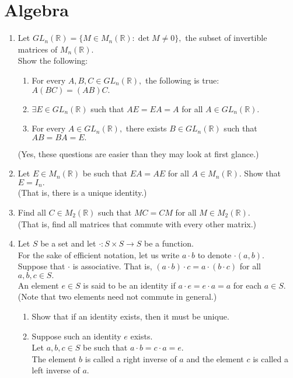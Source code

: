 \documentclass{article}
\begin{document}
\section{Algebra}
\begin{enumerate} 
	\item Let $GL_n(\mathbb{R}) = \{M \in M_n(\mathbb{R}) : \det M \neq 0\},$ the subset of invertible matrices of $M_n(\mathbb{R}).$\\
	Show the following:
	\begin{enumerate}[nosep] 
		\item For every $A, B, C \in GL_n(\mathbb{R}),$ the following is true: $A(BC) = (AB)C.$ 
		\item $\exists E \in GL_n(\mathbb{R})$ such that $AE = EA = A$ for all $A \in GL_n(\mathbb{R}).$
		\item For every $A \in GL_n(\mathbb{R}),$ there exists $B \in GL_n(\mathbb{R})$ such that $AB = BA = E.$
	\end{enumerate}
	(Yes, these questions are easier than they may look at first glance.)
	\item Let $E \in M_n(\mathbb{R})$ be such that $EA = AE$ for all $A \in M_n(\mathbb{R}).$ Show that $E = I_n.$\\
	(That is, there is a unique identity.)
	\item Find all $C \in M_2(\mathbb{R})$ such that $MC = CM$ for all $M \in M_2(\mathbb{R}).$\\
	(That is, find all matrices that commute with every other matrix.)
	\item Let $S$ be a set and let $\cdot:S\times S\to S$ be a function.\\
	For the sake of efficient notation, let us write $a\cdot b$ to denote $\cdot(a, b).$\\
	Suppose that $\cdot$ is associative. That is, $(a\cdot b)\cdot c = a\cdot(b\cdot c)$ for all $a, b, c \in S.$\\
	An element $e \in S$ is said to be an identity if $a\cdot e = e \cdot a = a$ for each $a \in S.$ (Note that two elements need not commute in general.)
	\begin{enumerate}[nosep] 
		\item Show that if an identity exists, then it must be unique.
		\item Suppose such an identity $e$ exists.\\
		Let $a, b, c \in S$ be such that $a \cdot b = c \cdot a = e.$\\
		The element $b$ is called a right inverse of $a$ and the element $c$ is called a left inverse of $a.$

\end{enumerate}
\end{enumerate}
\end{document}
